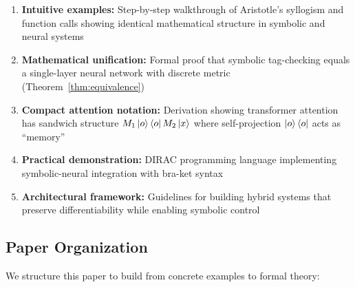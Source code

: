 \documentclass[11pt,a4paper]{article}
\theoremstyle{definition}
\begin{document}
\begin{enumerate}
\item \textbf{Intuitive examples:} Step-by-step walkthrough of Aristotle's syllogism and function calls showing identical mathematical structure in symbolic and neural systems

\item \textbf{Mathematical unification:} Formal proof that symbolic tag-checking equals a single-layer neural network with discrete metric (Theorem~\ref{thm:equivalence})

\item \textbf{Compact attention notation:} Derivation showing transformer attention has sandwich structure $M_1 \ket{o}\bra{o} M_2 \ket{x}$ where self-projection $\ket{o}\bra{o}$ acts as ``memory''

\item \textbf{Practical demonstration:} DIRAC programming language implementing symbolic-neural integration with bra-ket syntax

\item \textbf{Architectural framework:} Guidelines for building hybrid systems that preserve differentiability while enabling symbolic control
\end{enumerate}

\subsection{Paper Organization}

We structure this paper to build from concrete examples to formal theory:
\end{document}
